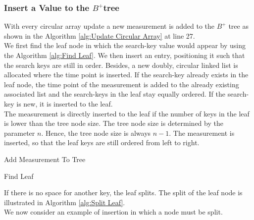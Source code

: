 \documentclass[abstracton,12pt]{scrreprt}
\begin{document}
\subsubsection{Insert a Value to the $B^+$tree}
With every circular array update a new measurement is added to the $B^+$ tree as shown in the Algorithm \ref{alg:Update Circular Array} at line 27.\\
We first find the leaf node in which the search-key value would
appear by using the Algorithm \ref{alg:Find Leaf}. We then insert an entry, positioning it such that the search keys are still in order. Besides, a new doubly, circular linked list is allocated where the time point is inserted. If the search-key already exists in the leaf node, the time point of the measurement is added to the already existing associated list and the search-keys in the leaf stay equally ordered. If the search-key is new, it is inserted to the leaf. \\
The measurement is directly inserted to the leaf if the number of keys in the leaf is lower than the tree node size. The tree node size is determined by the parameter $n$. Hence, the tree node size is always $n-1$. The measurement is inserted, so that the leaf keys are still ordered from left to right. \\
\begin{algorithm}[H]
	
	\caption{Add Measurement To Tree}
\end{algorithm}
\begin{algorithm}[H]
	
	\caption{Find Leaf}
\end{algorithm}

If there is no space for another key, the leaf splits. The split of the leaf node is illustrated in Algorithm \ref{alg:Split Leaf}.\\
We now consider an example of insertion in which a node must be split. 
\end{document}
